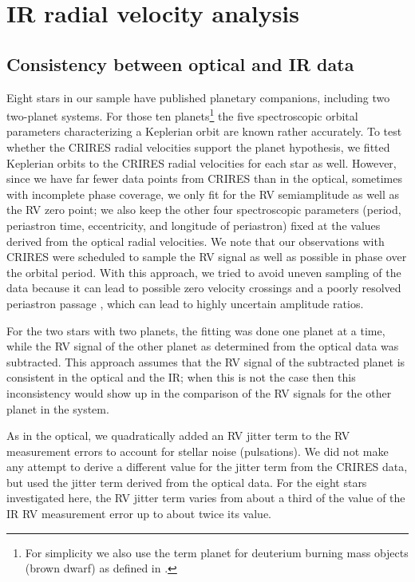 \documentclass{aa}
\begin{document}
\section{IR radial velocity analysis}
\label{IR data analysis}

\subsection{Consistency between optical and IR data}
\label{Comparison with the optical}



Eight stars in our sample have published planetary companions, including two two-planet systems. For those ten 
planets\footnote{For simplicity we also use the term planet for deuterium burning mass objects (brown dwarf)
as defined in \citet{Reffert2014}.} the five spectroscopic orbital parameters characterizing a Keplerian orbit are known rather accurately.  
To test whether the CRIRES radial velocities support the planet hypothesis, we fitted Keplerian
orbits to the CRIRES radial velocities for each star as well. However, since we have far fewer data points from CRIRES
than in the optical,   sometimes with incomplete phase coverage, we only fit for the RV semiamplitude 
as well as the RV zero point;  we also keep the other four spectroscopic parameters (period, periastron time,
eccentricity, and longitude of periastron) fixed at the values derived from the optical radial velocities. 
We note that our observations with CRIRES were scheduled to sample the RV signal as well as possible in phase over the orbital period. 
With this approach, we tried to avoid uneven sampling of the data because it can lead to possible zero velocity crossings
and a poorly resolved periastron passage \citep[e.g.,][]{Cumming2004}, which can lead to highly uncertain amplitude ratios.


For the two stars with two planets, the fitting was done one planet
at a time, while the RV signal of the other planet as determined from the optical data was 
subtracted. This approach assumes that the RV signal of the subtracted planet is consistent in the
optical and the IR; when this is not the case then this inconsistency would show up in the comparison 
of the RV signals for the other planet in the system.

As in the optical, we quadratically added an RV jitter term to the RV measurement errors 
to account for stellar noise (pulsations). We did not make any attempt to derive a different value for the jitter
term from the CRIRES data, but used the jitter term derived from the optical
data. For the eight stars investigated here, the RV jitter term varies
from about a third of the value of the IR RV measurement error up to about twice its value.
\end{document}
